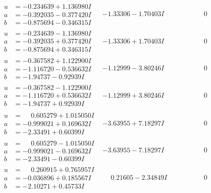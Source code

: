 \documentclass[1p]{elsarticle_modified}
\theoremstyle{definition}
\begin{document}
$$\begin{array}{c|c|c}
\begin{aligned}
u &= -0.234639 + 1.136980 I \\
a &= -0.392035 - 0.377420 I \\
b &= -0.875694 - 0.346315 I\end{aligned}
 & -1.33306 - 1.70403 I & \phantom{-0.000000 } 0 \\ \hline\begin{aligned}
u &= -0.234639 - 1.136980 I \\
a &= -0.392035 + 0.377420 I \\
b &= -0.875694 + 0.346315 I\end{aligned}
 & -1.33306 + 1.70403 I & \phantom{-0.000000 } 0 \\ \hline\begin{aligned}
u &= -0.367582 + 1.122900 I \\
a &= -1.116720 - 0.536632 I \\
b &= -1.94737 - 0.92939 I\end{aligned}
 & -1.12999 - 3.80246 I & \phantom{-0.000000 } 0 \\ \hline\begin{aligned}
u &= -0.367582 - 1.122900 I \\
a &= -1.116720 + 0.536632 I \\
b &= -1.94737 + 0.92939 I\end{aligned}
 & -1.12999 + 3.80246 I & \phantom{-0.000000 } 0 \\ \hline\begin{aligned}
u &= \phantom{-}0.605279 + 1.015050 I \\
a &= -0.999021 + 0.169632 I \\
b &= -2.33491 + 0.60399 I\end{aligned}
 & -3.63955 + 7.18297 I & \phantom{-0.000000 } 0 \\ \hline\begin{aligned}
u &= \phantom{-}0.605279 - 1.015050 I \\
a &= -0.999021 - 0.169632 I \\
b &= -2.33491 - 0.60399 I\end{aligned}
 & -3.63955 - 7.18297 I & \phantom{-0.000000 } 0 \\ \hline\begin{aligned}
u &= \phantom{-}0.260915 + 0.765957 I \\
a &= -0.036896 + 0.185567 I \\
b &= -2.10271 + 0.45733 I\end{aligned}
 & \phantom{-}0.21605 - 2.34849 I & \phantom{-0.000000 } 0 \\ \hline\begin{aligned}

\end{aligned}
\end{array}$$
\end{document}
